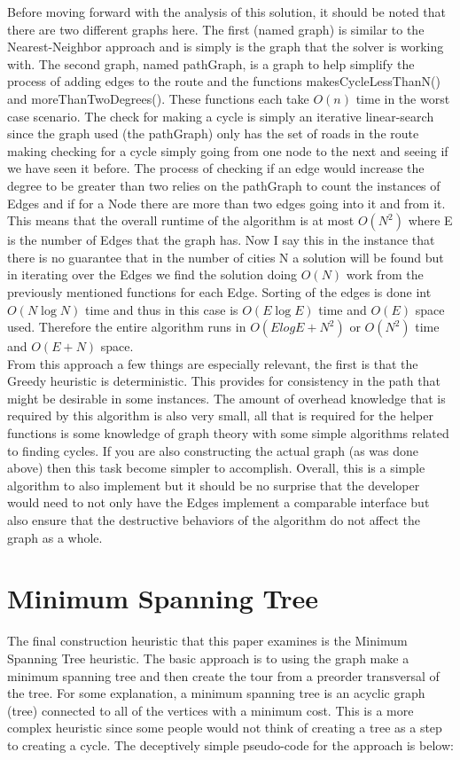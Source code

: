 \documentclass[midd]{thesis}
\newcommand{\tab}{\hspace*{2em}}
\begin{document}
\tab Before moving forward with the analysis of this solution, it should be noted that there are two different graphs here. The first (named graph) is similar to the Nearest-Neighbor approach and is simply is the graph that the solver is working with. The second graph, named pathGraph, is a graph to help simplify the process of adding edges to the route and the functions makesCycleLessThanN() and moreThanTwoDegrees(). These functions each take $O(n)$ time in the worst case scenario. The check for making a cycle is simply an iterative linear-search since the graph used (the pathGraph) only has the set of roads in the route making checking for a cycle simply going from one node to the next and seeing if we have seen it before. The process of checking if an edge would increase the degree to be greater than two relies on the pathGraph to count the instances of Edges and if for a Node there are more than two edges going into it and from it. This means that the overall runtime of the algorithm is at most $O(N^2)$ where E is the number of Edges that the graph has. Now I say this in the instance that there is no guarantee that in the number of cities N a solution will be found but in iterating over the Edges we find the solution doing $O(N)$ work from the previously mentioned functions for each Edge. Sorting of the edges is done int $O(N\log N)$ time and thus in this case is $O(E\log E)$ time and $O(E)$ space used. Therefore the entire algorithm runs in $O(ElogE + N^2)$ or $O(N^2)$ time and $O(E+N)$ space.\\
\tab From this approach a few things are especially relevant, the first is that the Greedy heuristic is deterministic. This provides for consistency in the path that might be desirable in some instances. The amount of overhead knowledge that is required by this algorithm is also very small, all that is required for the helper functions is some knowledge of graph theory with some simple algorithms related to finding cycles. If you are also constructing the actual graph (as was done above) then this task become simpler to accomplish. Overall, this is a simple algorithm to also implement but it should be no surprise that the developer would need to not only have the Edges implement a comparable interface but also ensure that the destructive behaviors of the algorithm do not affect the graph as a whole.

\section{Minimum Spanning Tree}
\tab The final construction heuristic that this paper examines is the Minimum Spanning Tree heuristic. The basic approach is to using the graph make a minimum spanning tree and then create the tour from a preorder transversal of the tree. For some explanation, a minimum spanning tree is an acyclic graph (tree) connected to all of the vertices with a minimum cost. This is a more complex heuristic since some people would not think of creating a tree as a step to creating a cycle. The deceptively simple pseudo-code for the approach is below:\\
\end{document}
